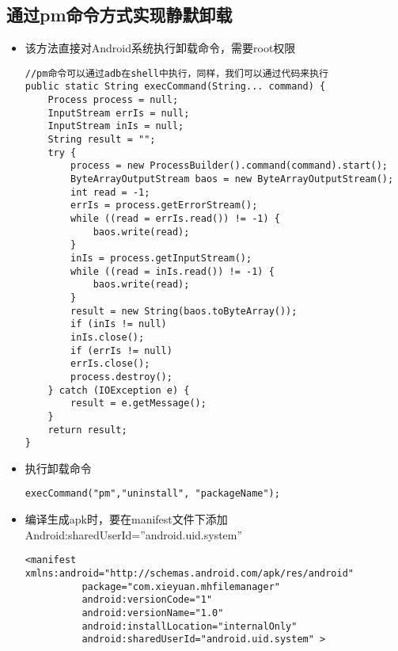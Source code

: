 \documentclass[9pt, b5paper]{article}
\begin{document}
\subsection{通过pm命令方式实现静默卸载}
\label{sec-6-3}
\begin{itemize}
\item 该方法直接对Android系统执行卸载命令，需要root权限
\begin{verbatim}
//pm命令可以通过adb在shell中执行，同样，我们可以通过代码来执行 
public static String execCommand(String... command) {
    Process process = null;
    InputStream errIs = null;
    InputStream inIs = null;
    String result = "";
    try {
        process = new ProcessBuilder().command(command).start();
        ByteArrayOutputStream baos = new ByteArrayOutputStream();
        int read = -1;
        errIs = process.getErrorStream();
        while ((read = errIs.read()) != -1) {
            baos.write(read);
        }
        inIs = process.getInputStream();
        while ((read = inIs.read()) != -1) {
            baos.write(read);
        }
        result = new String(baos.toByteArray());
        if (inIs != null)
        inIs.close();
        if (errIs != null)
        errIs.close();
        process.destroy();
    } catch (IOException e) {
        result = e.getMessage();
    }
    return result;
}
\end{verbatim}
\item 执行卸载命令
\begin{verbatim}
execCommand("pm","uninstall", "packageName");
\end{verbatim}
\item 编译生成apk时，要在manifest文件下添加Android:sharedUserId=”android.uid.system”
\begin{verbatim}
<manifest xmlns:android="http://schemas.android.com/apk/res/android"  
          package="com.xieyuan.mhfilemanager"  
          android:versionCode="1"  
          android:versionName="1.0"  
          android:installLocation="internalOnly"  
          android:sharedUserId="android.uid.system" >
\end{verbatim}
\end{itemize}
\end{document}
